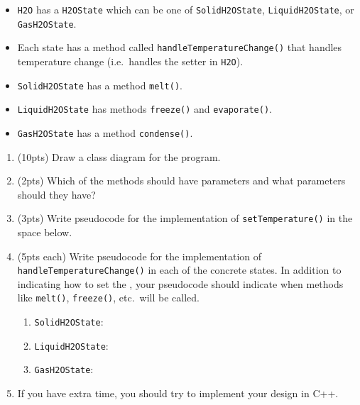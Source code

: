 \documentclass[11pt]{article}
\begin{document}
\begin{enumerate}
\begin{itemize}
    \item \texttt{H2O} has a \texttt{H2OState} which can be one of \texttt{SolidH2OState}, \texttt{LiquidH2OState}, or \texttt{GasH2OState}.

    \item Each state has a method called \texttt{handleTemperatureChange()} that handles temperature change (i.e.~handles the setter in \texttt{H2O}).

    \item \texttt{SolidH2OState} has a method \texttt{melt()}.

    \item \texttt{LiquidH2OState} has methods \texttt{freeze()} and \texttt{evaporate()}.

    \item \texttt{GasH2OState} has a method \texttt{condense()}.

  \end{itemize} 

  \begin{enumerate} 

    \item (10pts) Draw a class diagram for the program.

    \vfill

  \newpage

    \item (2pts) Which of the methods should have parameters and what parameters should they have?

    \vspace{1in}

    \item (3pts) Write pseudocode for the implementation of \texttt{setTemperature()} in the space below.

    \vspace{1in}

    \item (5pts each) Write pseudocode for the implementation of \texttt{handleTemperatureChange()} in each of the concrete states. In addition to indicating how to set the , your pseudocode should indicate when methods like \texttt{melt()}, \texttt{freeze()}, etc.~will be called. 

    \begin{enumerate}

      \item \texttt{SolidH2OState}:

      \vfill

      \item \texttt{LiquidH2OState}:

      \vfill

      \item \texttt{GasH2OState}:

      \vfill

    \end{enumerate}

      \item If you have extra time, you should try to implement your design in C++.

  \end{enumerate}

\end{enumerate}
\end{document}
